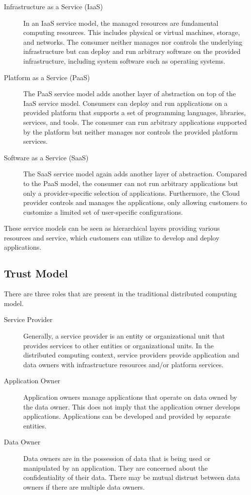 \begin{description}
  \item[Infrastructure as a Service (IaaS)]
    In an IaaS service model, the managed resources are fundamental computing
    resources. This includes physical or virtual machines, storage, and
    networks. The consumer neither manages nor controls the underlying
    infrastructure but can deploy and run arbitrary software on the provided
    infrastructure, including system software such as operating systems.

  \item[Platform as a Service (PaaS)]
    The PaaS service model adds another layer of abstraction on top of the IaaS
    service model. Consumers can deploy and run applications on a provided
    platform that supports a set of programming languages, libraries, services,
    and tools. The consumer can run arbitrary applications supported by the
    platform but neither manages nor controls the provided platform services.

  \item[Software as a Service (SaaS)]
    The SaaS service model again adds another layer of abstraction. Compared to
    the PaaS model, the consumer can not run arbitrary applications but only a
    provider-specific selection of applications. Furthermore, the Cloud provider
    controls and manages the applications, only allowing customers to customize
    a limited set of user-specific configurations.
\end{description}

These service models can be seen as hierarchical layers providing various
resources and service, which customers can utilize to develop and deploy
applications.

\subsection{Trust Model}

There are three roles that are present in the traditional distributed computing
model.

\begin{description}
  \item[Service Provider]
    Generally, a service provider is an entity or organizational unit that
    provides services to other entities or organizational units. In the
    distributed computing context, service providers provide application and
    data owners with infrastructure resources and/or platform services.

  \item[Application Owner]
    Application owners manage applications that operate on data owned by the
    data owner. This does not imply that the application owner develops
    applications. Applications can be developed and provided by separate
    entities.

  \item[Data Owner]
    Data owners are in the possession of data that is being used or manipulated
    by an application. They are concerned about the confidentiality of their
    data. There may be mutual distrust between data owners if there are multiple
    data owners.
\end{description}

